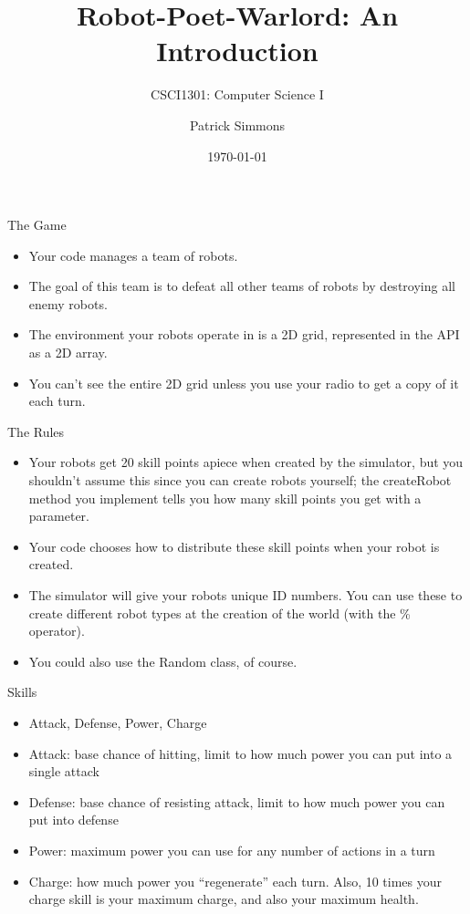 \documentclass[aspectratio=169]{beamer}
\begin{document}
\title{Robot-Poet-Warlord: An Introduction}
\subtitle{CSCI1301: Computer Science I}
\author{Patrick Simmons}
\date{\today}

\begin{frame}
  \titlepage
\end{frame}

\begin{frame}{The Game}
  \begin{itemize}
  \item Your code manages a team of robots.
  \item The goal of this team is to defeat all other teams of robots
    by destroying all enemy robots.
  \item The environment your robots operate in is a 2D grid,
    represented in the API as a 2D array.
  \item You can't see the entire 2D grid unless you use your radio to
    get a copy of it each turn.
  \end{itemize}
\end{frame}

\begin{frame}{The Rules}
  \begin{itemize}
  \item Your robots get 20 skill points apiece when created by the
    simulator, but you shouldn't assume this since you can create
    robots yourself; the createRobot method you implement tells you
    how many skill points you get with a parameter.
  \item Your code chooses how to distribute these skill points when
    your robot is created.
  \item The simulator will give your robots unique ID numbers.  You
    can use these to create different robot types at the creation of
    the world (with the \% operator).
  \item You could also use the Random class, of course.
  \end{itemize}
\end{frame}

\begin{frame}{Skills}
  \begin{itemize}
  \item Attack, Defense, Power, Charge
  \item Attack: base chance of hitting, limit to how much power you
    can put into a single attack
  \item Defense: base chance of resisting attack, limit to how much
    power you can put into defense
  \item Power: maximum power you can use for any number of actions
    in a turn
  \item Charge: how much power you ``regenerate'' each turn.  Also,
    10 times your charge skill is your maximum charge, and also your
    maximum health.
  \end{itemize}
\end{frame}
\end{document}
